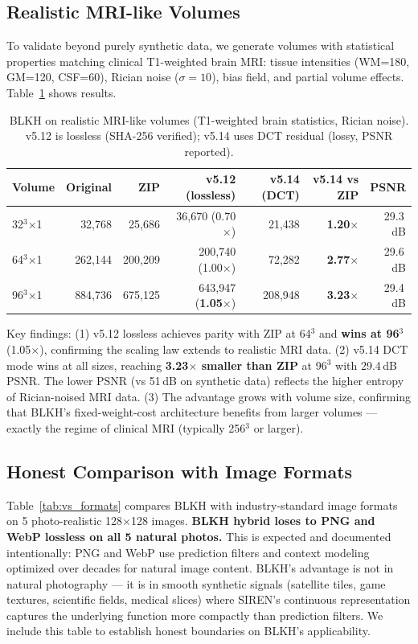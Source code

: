 \documentclass[11pt,a4paper]{article}
\begin{document}
\subsection{Realistic MRI-like Volumes}

To validate beyond purely synthetic data, we generate volumes with statistical properties matching clinical T1-weighted brain MRI: tissue intensities (WM=180, GM=120, CSF=60), Rician noise ($\sigma{=}10$), bias field, and partial volume effects. Table~\ref{tab:mri} shows results.

\begin{table}[t]
\centering
\caption{BLKH on realistic MRI-like volumes (T1-weighted brain statistics, Rician noise). v5.12 is lossless (SHA-256 verified); v5.14 uses DCT residual (lossy, PSNR reported).}
\label{tab:mri}
\begin{tabular}{lrrrrrr}
\toprule
Volume & Original & ZIP & v5.12 (lossless) & v5.14 (DCT) & v5.14 vs ZIP & PSNR \\
\midrule
32$^3$$\times$1 & 32,768 & 25,686 & 36,670 (0.70$\times$) & 21,438 & \textbf{1.20$\times$} & 29.3\,dB \\
64$^3$$\times$1 & 262,144 & 200,209 & 200,740 (1.00$\times$) & 72,282 & \textbf{2.77$\times$} & 29.6\,dB \\
96$^3$$\times$1 & 884,736 & 675,125 & 643,947 (\textbf{1.05$\times$}) & 208,948 & \textbf{3.23$\times$} & 29.4\,dB \\
\bottomrule
\end{tabular}
\end{table}

Key findings: (1) v5.12 lossless achieves parity with ZIP at 64$^3$ and \textbf{wins at 96$^3$} (1.05$\times$), confirming the scaling law extends to realistic MRI data. (2) v5.14 DCT mode wins at all sizes, reaching \textbf{3.23$\times$ smaller than ZIP} at 96$^3$ with 29.4\,dB PSNR. The lower PSNR (vs 51\,dB on synthetic data) reflects the higher entropy of Rician-noised MRI data. (3) The advantage grows with volume size, confirming that BLKH's fixed-weight-cost architecture benefits from larger volumes --- exactly the regime of clinical MRI (typically 256$^3$ or larger).

\subsection{Honest Comparison with Image Formats}

Table~\ref{tab:vs_formats} compares BLKH with industry-standard image formats on 5 photo-realistic 128$\times$128 images. \textbf{BLKH hybrid loses to PNG and WebP lossless on all 5 natural photos.} This is expected and documented intentionally: PNG and WebP use prediction filters and context modeling optimized over decades for natural image content. BLKH's advantage is not in natural photography --- it is in smooth synthetic signals (satellite tiles, game textures, scientific fields, medical slices) where SIREN's continuous representation captures the underlying function more compactly than prediction filters. We include this table to establish honest boundaries on BLKH's applicability.
\end{document}
